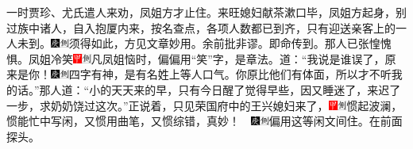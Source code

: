 一时贾珍、尤氏遣人来劝，凤姐方才止住。来旺媳妇献茶漱口毕，凤姐方起身，别过族中诸人，自入抱厦内来，按名查点，各项人数都已到齐，只有迎送亲客上的一人未到。{\includegraphics[width=3mm]{../Images/00004}\includegraphics[width=3mm]{../Images/00011}\footnotesize \kaishu 须得如此，方见文章妙用。余前批非谬。}即命传到。那人已张惶愧惧。凤姐冷笑{\includegraphics[width=3mm]{../Images/00002}\includegraphics[width=3mm]{../Images/00011}\footnotesize \kaishu 凡凤姐恼时，偏偏用``笑''字，是章法。}道：``我说是谁误了，原来是你！{\includegraphics[width=3mm]{../Images/00004}\includegraphics[width=3mm]{../Images/00011}\footnotesize \kaishu 四字有神，是有名姓上等人口气。}你原比他们有体面，所以才不听我的话。''那人道：``小的天天来的早，只有今日醒了觉得早些，因又睡迷了，来迟了一步，求奶奶饶过这次。''正说着，只见荣国府中的王兴媳妇来了，{\includegraphics[width=3mm]{../Images/00002}\includegraphics[width=3mm]{../Images/00011}\footnotesize \kaishu 惯起波澜，惯能忙中写闲，又惯用曲笔，又惯综错，真妙！　\includegraphics[width=3mm]{../Images/00004}\includegraphics[width=3mm]{../Images/00011}\footnotesize \kaishu 偏用这等闲文间住。}在前面探头。

